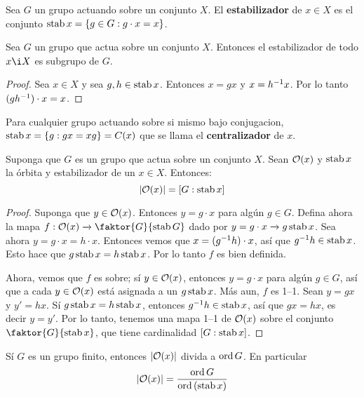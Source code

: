 \begin{definition}
    Sea $G$ un grupo actuando sobre un conjunto  $X$. El  \textbf{estabilizador}
    de $x \in X$ es el conjunto  $\operatorname{stab}{x}=\{g \in G : g \cdot x=x\}$.
\end{definition}

\begin{lemma}\label{7.28}
    Sea $G$ un grupo que actua sobre un conjunto $X$. Entonces el estabilizador
    de todo $x \i X$ es subgrupo de  $G$.
\end{lemma}
\begin{proof}
    Sea $x \in X$ y sea $g,h \in \operatorname{stab}{x}$. Entonces $x=gx$ y  $x=h^{-1}x$. Por
    lo tanto $(gh^{-1}) \cdot x=x$.
\end{proof}

\begin{example}\label{}
    Para cualquier grupo actuando sobre si mismo bajo conjugacion,
    $\operatorname{stab}{x}=\{g : gx=xg\}=C(x)$ que se llama el \textbf{centralizador} de $x$.
\end{example}

\begin{theorem}\label{7.29}
    Suponga que $G$ es un grupo que actua sobre un conjunto  $X$. Sean  $
    \mathcal{O}(x)$ y $\operatorname{stab}{x}$ la \'orbita y estabilizador de un $x \in X$. Entonces:
    \begin{equation*}
        |\mathcal{O}(x)|=[G:\operatorname{stab}{x}]
    \end{equation*}
\end{theorem}
\begin{proof}
    Suponga que $y \in \mathcal{O}(x)$. Entonces $y=g \cdot x$ para alg\'un  $g \in G$.
    Defina ahora la mapa  $f:\Oc(x) \xrightarrow{} \faktor{G}{\stab{G}}$ dado
    por $y=g \cdot x \xrightarrow{} g\operatorname{stab}{x}$. Sea ahora $y=g \cdot x=h \cdot
    x$. Entonces vemos que  $x=(g^{-1}h) \cdot x$, as\'i que $g^{-1}h \in
    \operatorname{stab}{x}$. Esto hace que $g\operatorname{stab}{x}=h\operatorname{stab}{x}$. Por lo tanto $f$ es bien
    definida.

    Ahora, vemos que $f$ es sobre; s\'i $y \in \mathcal{O}(x)$, entonces $y=g \cdot x$
    para alg\'un $g \in G$, as\'i que a cada  $y \in \mathcal{O}(x)$ est\'a asignada a
    un $g\operatorname{stab}{x}$. M\'as aun, $f$ es 1--1. Sean $y=gx$ y  $y'=hx$. S\'i
    $g\operatorname{stab}{x}=h\operatorname{stab}{x}$, entonces $g^{-1}h \in \operatorname{stab}{x}$, as\'i que $gx=hx$,
    es decir  $y=y'$. Por lo tanto, tenemos una mapa 1--1 de  $\mathcal{O}(x)$ sobre el
    conjunto $\faktor{G}{\stab{x}}$, que tiene cardinalidad $[G:\operatorname{stab}{x}]$.
\end{proof}
\begin{corollary}
    S\'i $G$ es un grupo finito, entonces  $|\mathcal{O}(x)|$ divida a $\operatorname{ord}{G}$. En
    particular
    \begin{equation*}
        |\mathcal{O}(x)|=\frac{\operatorname{ord}{G}}{\operatorname{ord}{(\operatorname{stab}{x})}}
    \end{equation*}
\end{corollary}
